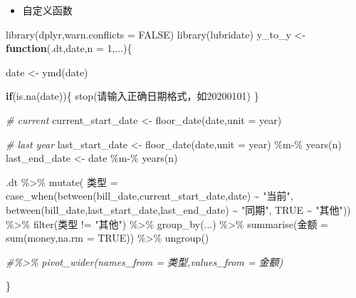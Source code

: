 \documentclass[
]{book}
\newenvironment{Shaded}{\begin{snugshade}}{\end{snugshade}}
\newcommand{\AttributeTok}[1]{\textcolor[rgb]{0.77,0.63,0.00}{#1}}
\newcommand{\CommentTok}[1]{\textcolor[rgb]{0.56,0.35,0.01}{\textit{#1}}}
\newcommand{\ConstantTok}[1]{\textcolor[rgb]{0.00,0.00,0.00}{#1}}
\newcommand{\ControlFlowTok}[1]{\textcolor[rgb]{0.13,0.29,0.53}{\textbf{#1}}}
\newcommand{\DecValTok}[1]{\textcolor[rgb]{0.00,0.00,0.81}{#1}}
\newcommand{\FunctionTok}[1]{\textcolor[rgb]{0.00,0.00,0.00}{#1}}
\newcommand{\NormalTok}[1]{#1}
\newcommand{\OtherTok}[1]{\textcolor[rgb]{0.56,0.35,0.01}{#1}}
\newcommand{\SpecialCharTok}[1]{\textcolor[rgb]{0.00,0.00,0.00}{#1}}
\newcommand{\StringTok}[1]{\textcolor[rgb]{0.31,0.60,0.02}{#1}}
\providecommand{\tightlist}{%
  \setlength{\itemsep}{0pt}\setlength{\parskip}{0pt}}
\begin{document}
\begin{itemize}
\tightlist
\item
  自定义函数
\end{itemize}

\begin{Shaded}
\begin{Highlighting}[]
\FunctionTok{library}\NormalTok{(dplyr,}\AttributeTok{warn.conflicts =} \ConstantTok{FALSE}\NormalTok{)}
\FunctionTok{library}\NormalTok{(lubridate)}
\NormalTok{y\_to\_y }\OtherTok{\textless{}{-}} \ControlFlowTok{function}\NormalTok{(.dt,date,}\AttributeTok{n =} \DecValTok{1}\NormalTok{,...)\{}
  
\NormalTok{  date }\OtherTok{\textless{}{-}} \FunctionTok{ymd}\NormalTok{(date)}
  
  \ControlFlowTok{if}\NormalTok{(}\FunctionTok{is.na}\NormalTok{(date))\{}
    \FunctionTok{stop}\NormalTok{(}\StringTok{\textquotesingle{}请输入正确日期格式，如20200101\textquotesingle{}}\NormalTok{)}
\NormalTok{  \} }
  
  \CommentTok{\# current }
\NormalTok{ current\_start\_date }\OtherTok{\textless{}{-}}  \FunctionTok{floor\_date}\NormalTok{(date,}\AttributeTok{unit =} \StringTok{\textquotesingle{}year\textquotesingle{}}\NormalTok{)}
 
 \CommentTok{\# last year}
\NormalTok{ last\_start\_date }\OtherTok{\textless{}{-}} \FunctionTok{floor\_date}\NormalTok{(date,}\AttributeTok{unit =} \StringTok{\textquotesingle{}year\textquotesingle{}}\NormalTok{) }\SpecialCharTok{\%m{-}\%} \FunctionTok{years}\NormalTok{(n)}
\NormalTok{ last\_end\_date }\OtherTok{\textless{}{-}}\NormalTok{ date }\SpecialCharTok{\%m{-}\%} \FunctionTok{years}\NormalTok{(n)}
 
\NormalTok{ .dt }\SpecialCharTok{\%\textgreater{}\%} \FunctionTok{mutate}\NormalTok{( 类型 }\OtherTok{=} \FunctionTok{case\_when}\NormalTok{(}\FunctionTok{between}\NormalTok{(bill\_date,current\_start\_date,date) }\SpecialCharTok{\textasciitilde{}} \StringTok{"当前"}\NormalTok{,}
               \FunctionTok{between}\NormalTok{(bill\_date,last\_start\_date,last\_end\_date) }\SpecialCharTok{\textasciitilde{}} \StringTok{"同期"}\NormalTok{,}
               \ConstantTok{TRUE} \SpecialCharTok{\textasciitilde{}} \StringTok{"其他"}\NormalTok{)) }\SpecialCharTok{\%\textgreater{}\%} 
   \FunctionTok{filter}\NormalTok{(类型 }\SpecialCharTok{!=} \StringTok{"其他"}\NormalTok{) }\SpecialCharTok{\%\textgreater{}\%} 
   \FunctionTok{group\_by}\NormalTok{(...) }\SpecialCharTok{\%\textgreater{}\%} 
   \FunctionTok{summarise}\NormalTok{(金额 }\OtherTok{=} \FunctionTok{sum}\NormalTok{(money,}\AttributeTok{na.rm =} \ConstantTok{TRUE}\NormalTok{)) }\SpecialCharTok{\%\textgreater{}\%} 
   \FunctionTok{ungroup}\NormalTok{() }
 
 \CommentTok{\#\%\textgreater{}\% pivot\_wider(names\_from = \textquotesingle{}类型\textquotesingle{},values\_from = \textquotesingle{}金额\textquotesingle{})}
 
\NormalTok{\}}
\end{Highlighting}
\end{Shaded}
\end{document}
